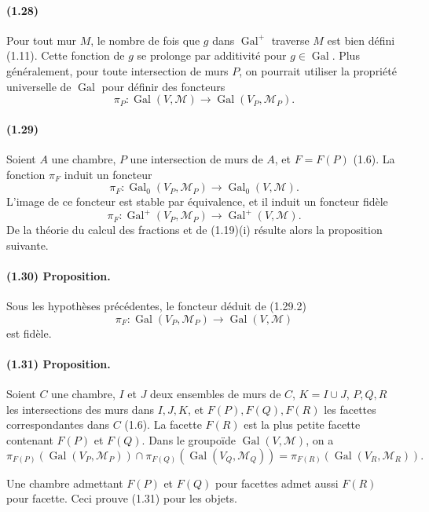 \documentclass[10pt]{article}
\begin{document}
\paragraph{(1.28)} Pour tout mur \(M\), le nombre de fois que \(g\) dans \(\operatorname{Gal}^+\) traverse \(M\) est bien défini (1.11). Cette fonction de \(g\) se prolonge par additivité pour \(g\in\operatorname{Gal}\). Plus généralement, pour toute intersection de murs \(P\), on pourrait utiliser la propriété universelle de \(\operatorname{Gal}\) pour définir des foncteurs
\[
\pi_P:\operatorname{Gal}(V,\mathcal M)\longrightarrow \operatorname{Gal}(V_P,\mathcal M_P).
\]

\paragraph{(1.29)} Soient \(A\) une chambre, \(P\) une intersection de murs de \(A\), et \(F=F(P)\) (1.6). La fonction \(\pi_F\) induit un foncteur
\[
\tag{1.29.1}
\pi_F:\operatorname{Gal}_0(V_P,\mathcal M_P)\longrightarrow\operatorname{Gal}_0(V,\mathcal M).
\]
L'image de ce foncteur est stable par équivalence, et il induit un foncteur fidèle
\[
\tag{1.29.2}
\pi_F:\operatorname{Gal}^+(V_P,\mathcal M_P)\longrightarrow\operatorname{Gal}^+(V,\mathcal M).
\]
De la théorie du calcul des fractions et de (1.19)(i) résulte alors la proposition suivante.

\paragraph{(1.30) Proposition.} Sous les hypothèses précédentes, le foncteur déduit de (1.29.2)
\[
\pi_F:\operatorname{Gal}(V_P,\mathcal M_P)\longrightarrow\operatorname{Gal}(V,\mathcal M)
\]
est fidèle.

\paragraph{(1.31) Proposition.} Soient \(C\) une chambre, \(I\) et \(J\) deux ensembles de murs de \(C\), \(K=I\cup J\), \(P,Q,R\) les intersections des murs dans \(I,J,K\), et \(F(P),F(Q),F(R)\) les facettes correspondantes dans \(C\) (1.6). La facette \(F(R)\) est la plus petite facette contenant \(F(P)\) et \(F(Q)\). Dans le groupoïde \(\operatorname{Gal}(V,\mathcal M)\), on a
\[
\pi_{F(P)}(\operatorname{Gal}(V_P,\mathcal M_P))\cap
\pi_{F(Q)}(\operatorname{Gal}(V_Q,\mathcal M_Q))
=
\pi_{F(R)}(\operatorname{Gal}(V_R,\mathcal M_R)).
\]

Une chambre admettant \(F(P)\) et \(F(Q)\) pour facettes admet aussi \(F(R)\) pour facette. Ceci prouve (1.31) pour les objets.
\end{document}

